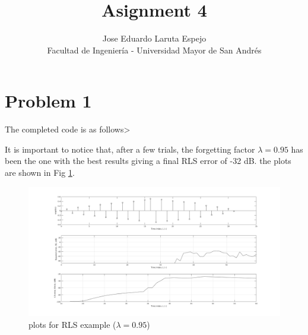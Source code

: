 \documentclass[12pt,letterpaper]{article}
\title{Asignment 4}
\author{Jose Eduardo Laruta Espejo \\ Facultad de Ingeniería - Universidad Mayor de San Andrés}
\begin{document}
\maketitle
\section{Problem 1}
The completed code is as follows>



It is important to notice that, after a few trials, the forgetting factor $\lambda = 0.95$ has been the one with 
the best results giving a final RLS error of -32 dB. the plots are shown in Fig \ref{fig:res}.

\begin{figure}[!h] 
  \centering
  \includegraphics[width=1\textwidth]{../matlab/img/plots.png}
  \caption{plots for RLS example ($\lambda = 0.95$)}
  \label{fig:res}
\end{figure}
\end{document}
